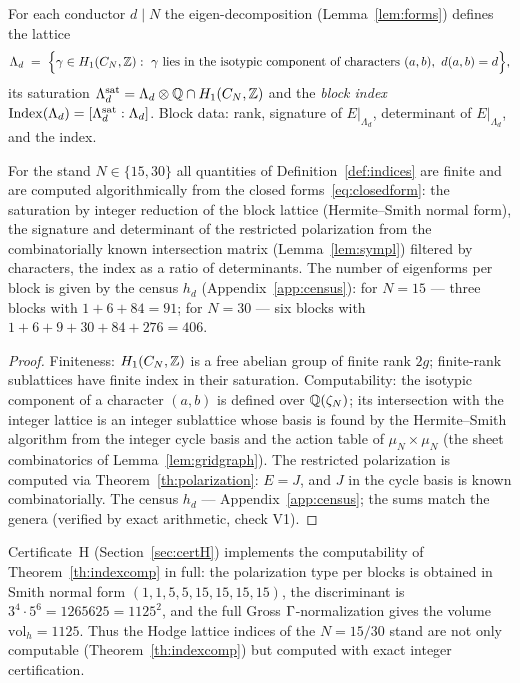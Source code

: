 \begin{definition}\label{def:indices}
For each conductor $d\mid N$ the eigen-decomposition
(Lemma~\ref{lem:forms}) defines the lattice
\[
  \Lambda_d \;=\; \Bigl\{\gamma\in H_1(C_N,\mathbb{Z}):\ \gamma
  \text{ lies in the isotypic component of characters }(a,b),\
  d(a,b)=d\Bigr\},
\]
its saturation $\Lambda_d^{\mathrm{sat}}=\Lambda_d\otimes\mathbb{Q}\cap
H_1(C_N,\mathbb{Z})$ and the \emph{block index}
$\operatorname{Index}(\Lambda_d)=[\Lambda_d^{\mathrm{sat}}:\Lambda_d]$. Block data:
rank, signature of $E|_{\Lambda_d}$, determinant of $E|_{\Lambda_d}$,
and the index.
\end{definition}

\begin{theorem}
\label{th:indexcomp}
For the stand $N\in\{15,30\}$ all quantities of
Definition~\ref{def:indices} are finite and are computed
algorithmically from the closed forms~\eqref{eq:closedform}: the
saturation by integer reduction of the block lattice (Hermite--Smith
normal form), the signature and determinant of the restricted
polarization from the combinatorially known intersection matrix
(Lemma~\ref{lem:sympl}) filtered by characters, the index as a ratio
of determinants. The number of eigenforms per block is given by the
census $h_d$ (Appendix~\ref{app:census}): for $N=15$ --- three blocks
with $1+6+84=91$; for $N=30$ --- six blocks with
$1+6+9+30+84+276=406$.
\end{theorem}

\begin{proof}
Finiteness: $H_1(C_N,\mathbb{Z})$ is a free abelian group of finite rank
$2g$; finite-rank sublattices have finite index in their saturation.
Computability: the isotypic component of a character $(a,b)$ is
defined over $\mathbb{Q}(\zeta_N)$; its intersection with the integer
lattice is an integer sublattice whose basis is found by the
Hermite--Smith algorithm from the integer cycle basis and the action
table of $\mu_N\times\mu_N$ (the sheet combinatorics of
Lemma~\ref{lem:gridgraph}). The restricted polarization is computed
via Theorem~\ref{th:polarization}: $E=J$, and $J$ in the cycle basis
is known combinatorially. The census $h_d$ ---
Appendix~\ref{app:census}; the sums match the genera (verified by
exact arithmetic, check V1).
\end{proof}

\begin{statusbox}
Certificate~H (Section~\ref{sec:certH}) implements the computability
of Theorem~\ref{th:indexcomp} in full: the polarization type per
blocks is obtained in Smith normal form
$(1,1,5,5,15,15,15,15)$, the discriminant is
$3^4\cdot5^6=1265625=1125^2$, and the full Gross $\Gamma$-normalization
gives the volume $\mathrm{vol}_h=1125$. Thus the Hodge lattice
indices of the $N=15/30$ stand are not only computable
(Theorem~\ref{th:indexcomp}) but computed with exact integer
certification.
\end{statusbox}

